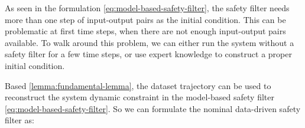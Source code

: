 \begin{remark}\label{remark:usage-output-safety-filter}
    As seen in the formulation \cref{eq:model-based-safety-filter}, the safety filter needs more than one step of input-output pairs as the initial condition.
    This can be problematic at first time steps, when there are not enough input-output pairs available.
    To walk around this problem, we can either run the system without a safety filter for a few time steps, or use expert knowledge to construct a proper initial condition.
\end{remark}

Based \cref{lemma:fundamental-lemma}, the dataset trajectory can be used to reconstruct the system dynamic constraint in the model-based safety filter \cref{eq:model-based-safety-filter}.
So we can formulate the nominal data-driven safety filter as:

